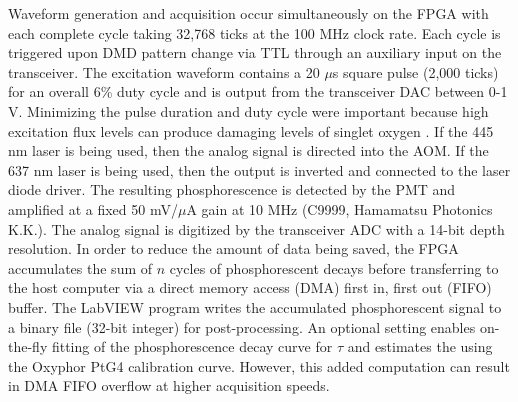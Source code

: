 Waveform generation and acquisition occur simultaneously on the FPGA with each complete cycle taking 32,768 ticks at the 100 MHz clock rate. Each cycle is triggered upon DMD pattern change via TTL through an auxiliary input on the transceiver. The excitation waveform contains a 20 $\mu$s square pulse (2,000 ticks) for an overall 6\% duty cycle and is output from the transceiver DAC between 0-1 V. Minimizing the pulse duration and duty cycle were important because high excitation flux levels can produce damaging levels of singlet oxygen \cite{Wilson:2005te}. If the 445 nm laser is being used, then the analog signal is directed into the AOM. If the 637 nm laser is being used, then the output is inverted and connected to the laser diode driver. The resulting phosphorescence is detected by the PMT and amplified at a fixed 50 mV/$\mu$A gain at 10 MHz (C9999, Hamamatsu Photonics K.K.). The analog signal is digitized by the transceiver ADC with a 14-bit depth resolution. In order to reduce the amount of data being saved, the FPGA accumulates the sum of $n$ cycles of phosphorescent decays before transferring to the host computer via a direct memory access (DMA) first in, first out (FIFO) buffer. The LabVIEW program writes the accumulated phosphorescent signal to a binary file (32-bit integer) for post-processing. An optional setting enables on-the-fly fitting of the phosphorescence decay curve for $\tau$ and estimates the  using the Oxyphor PtG4 calibration curve. However, this added computation can result in DMA FIFO overflow at higher acquisition speeds.

\begin{table}
    \caption[Common phosphorescence lifetime acquisition settings]{
        Common acquisition settings for the phosphorescence lifetime measurements ($n$ = number of DMD patterns). Raw data is acquired by the FPGA at a rate of 160 MB/s.
    }
    \label{tab:lifetime_settings}
    \centering
\end{table}

